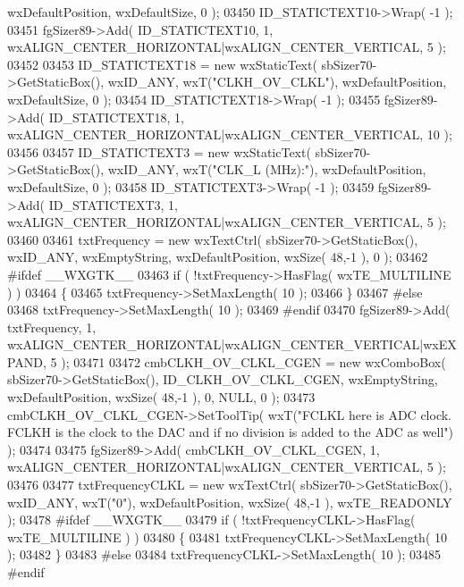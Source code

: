 \begin{DoxyCode}
      wxDefaultPosition, wxDefaultSize, 0 );
03450     ID_STATICTEXT10->Wrap( -1 );
03451     fgSizer89->Add( ID_STATICTEXT10, 1, wxALIGN\_CENTER\_HORIZONTAL|wxALIGN\_CENTER\_VERTICAL, 5 );
03452     
03453     ID_STATICTEXT18 = \textcolor{keyword}{new} wxStaticText( sbSizer70->GetStaticBox(), wxID\_ANY, wxT(\textcolor{stringliteral}{"CLKH\_OV\_CLKL"}), 
      wxDefaultPosition, wxDefaultSize, 0 );
03454     ID_STATICTEXT18->Wrap( -1 );
03455     fgSizer89->Add( ID_STATICTEXT18, 1, wxALIGN\_CENTER\_HORIZONTAL|wxALIGN\_CENTER\_VERTICAL, 10 );
03456     
03457     ID_STATICTEXT3 = \textcolor{keyword}{new} wxStaticText( sbSizer70->GetStaticBox(), wxID\_ANY, wxT(\textcolor{stringliteral}{"CLK\_L (MHz):"}), 
      wxDefaultPosition, wxDefaultSize, 0 );
03458     ID_STATICTEXT3->Wrap( -1 );
03459     fgSizer89->Add( ID_STATICTEXT3, 1, wxALIGN\_CENTER\_HORIZONTAL|wxALIGN\_CENTER\_VERTICAL, 5 );
03460     
03461     txtFrequency = \textcolor{keyword}{new} wxTextCtrl( sbSizer70->GetStaticBox(), wxID\_ANY, wxEmptyString, wxDefaultPosition, 
      wxSize( 48,-1 ), 0 );
03462 \textcolor{preprocessor}{    #ifdef \_\_WXGTK\_\_}
03463     \textcolor{keywordflow}{if} ( !txtFrequency->HasFlag( wxTE\_MULTILINE ) )
03464     \{
03465     txtFrequency->SetMaxLength( 10 );
03466     \}
03467 \textcolor{preprocessor}{    #else}
03468     txtFrequency->SetMaxLength( 10 );
03469 \textcolor{preprocessor}{    #endif}
03470     fgSizer89->Add( txtFrequency, 1, wxALIGN\_CENTER\_HORIZONTAL|wxALIGN\_CENTER\_VERTICAL|wxEXPAND, 5 );
03471     
03472     cmbCLKH_OV_CLKL_CGEN = \textcolor{keyword}{new} wxComboBox( sbSizer70->GetStaticBox(), 
      ID_CLKH_OV_CLKL_CGEN, wxEmptyString, wxDefaultPosition, wxSize( 48,-1 ), 0, NULL, 0 ); 
03473     cmbCLKH_OV_CLKL_CGEN->SetToolTip( wxT(\textcolor{stringliteral}{"FCLKL here is ADC clock. FCLKH is the clock to the DAC and if no
       division is added to the ADC as well"}) );
03474     
03475     fgSizer89->Add( cmbCLKH_OV_CLKL_CGEN, 1, wxALIGN\_CENTER\_HORIZONTAL|wxALIGN\_CENTER\_VERTICAL, 5 );
03476     
03477     txtFrequencyCLKL = \textcolor{keyword}{new} wxTextCtrl( sbSizer70->GetStaticBox(), wxID\_ANY, wxT(\textcolor{stringliteral}{"0"}), wxDefaultPosition, 
      wxSize( 48,-1 ), wxTE\_READONLY );
03478 \textcolor{preprocessor}{    #ifdef \_\_WXGTK\_\_}
03479     \textcolor{keywordflow}{if} ( !txtFrequencyCLKL->HasFlag( wxTE\_MULTILINE ) )
03480     \{
03481     txtFrequencyCLKL->SetMaxLength( 10 );
03482     \}
03483 \textcolor{preprocessor}{    #else}
03484     txtFrequencyCLKL->SetMaxLength( 10 );
03485 \textcolor{preprocessor}{    #endif}

\end{DoxyCode}
